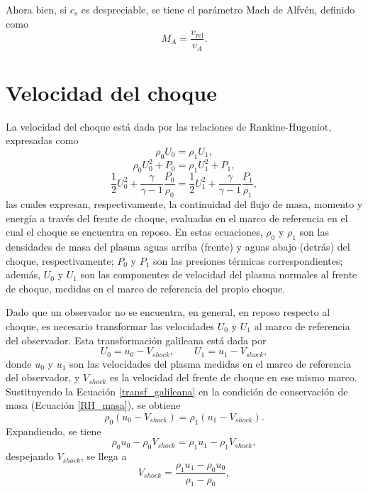 Ahora bien, si $c_s$ es despreciable, se tiene el parámetro Mach de Alfvén, definido como
\begin{equation*}
M_{A}=\frac{v_{\text{rel}}}{v_{A}}.
\end{equation*}

\section{Velocidad del choque}
\label{velocidaddelchoque}
La velocidad del choque está dada por las relaciones de Rankine-Hugoniot, expresadas como
\begin{equation}
    \rho_{0}U_{0}=\rho_{1}U_{1},
    \label{RH_masa}
\end{equation}
\begin{equation}
    \rho_{0}U_{0}^{2}+P_{0}=\rho_{1}U_{1}^{2}+P_{1},
    \label{RH_momento}
\end{equation}
\begin{equation}
    \frac{1}{2}U_{0}^{2}+\frac{\gamma}{\gamma-1}\frac{P_{0}}{\rho_{0}}=\frac{1}{2}U_{1}^{2}+\frac{\gamma}{\gamma-1}\frac{P_{1}}{\rho_{1}},
    \label{RH_energia}
\end{equation}
las cuales expresan, respectivamente, la continuidad del flujo de masa, momento y energía a través del frente de choque, evaluadas en el marco de referencia en el cual el choque se encuentra en reposo. En estas ecuaciones, $\rho_{0}$ y $\rho_{1}$ son las densidades de masa del plasma aguas arriba (frente) y aguas abajo (detrás) del choque, respectivamente; $P_{0}$ y $P_{1}$ son las presiones térmicas correspondientes; además, $U_{0}$ y $U_{1}$ son las componentes de velocidad del plasma normales al frente de choque, medidas en el marco de referencia del propio choque. 

Dado que un observador no se encuentra, en general, en reposo respecto al choque, es necesario transformar las velocidades $U_{0}$ y $U_{1}$ al marco de referencia del observador. Esta transformación galileana está dada por
\begin{equation}
    U_{0} = u_{0} - V_{shock}, \qquad U_{1} = u_{1} - V_{shock},
    \label{transf_galileana}
\end{equation}
donde $u_{0}$ y $u_{1}$ son las velocidades del plasma medidas en el marco de referencia del observador, y $V_{shock}$ es la velocidad del frente de choque en ese mismo marco. Sustituyendo la Ecuación \eqref{transf_galileana} en la condición de conservación de masa (Ecuación \ref{RH_masa}), se obtiene
\begin{equation*}
    \rho_{0}\left(u_{0}-V_{shock}\right)=\rho_{1}\left(u_{1}-V_{shock}\right).
\end{equation*}
Expandiendo, se tiene
\begin{equation*}
    \rho_{0}u_{0}-\rho_{0}V_{shock}=\rho_{1}u_{1}-\rho_{1}V_{shock},
\end{equation*}
despejando $V_{shock}$, se llega a
\begin{equation*}
    V_{shock}=\frac{\rho_{1}u_{1}-\rho_{0}u_{0}}{\rho_{1}-\rho_{0}},
    \label{Vshock}
\end{equation*}


